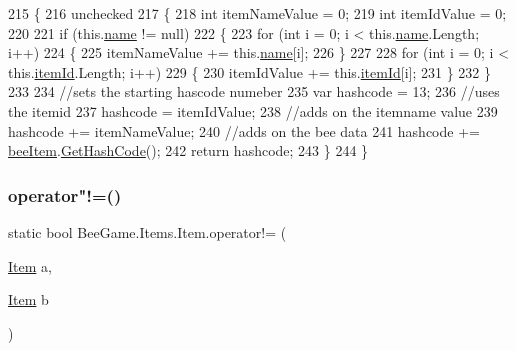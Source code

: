 \begin{DoxyCode}
215         \{
216             unchecked
217             \{
218                 \textcolor{keywordtype}{int} itemNameValue = 0;
219                 \textcolor{keywordtype}{int} itemIdValue = 0;
220 
221                 \textcolor{keywordflow}{if} (this.\hyperlink{struct_bee_game_1_1_items_1_1_item_a0b0bd7eb510757f650f1be3d05b23fc8}{name} != null)
222                 \{
223                     \textcolor{keywordflow}{for} (\textcolor{keywordtype}{int} i = 0; i < this.\hyperlink{struct_bee_game_1_1_items_1_1_item_a0b0bd7eb510757f650f1be3d05b23fc8}{name}.Length; i++)
224                     \{
225                         itemNameValue += this.\hyperlink{struct_bee_game_1_1_items_1_1_item_a0b0bd7eb510757f650f1be3d05b23fc8}{name}[i];
226                     \}
227 
228                     \textcolor{keywordflow}{for} (\textcolor{keywordtype}{int} i = 0; i < this.\hyperlink{struct_bee_game_1_1_items_1_1_item_aa85bfeab893271c26f8ca41b638ada1c}{itemId}.Length; i++)
229                     \{
230                         itemIdValue += this.\hyperlink{struct_bee_game_1_1_items_1_1_item_aa85bfeab893271c26f8ca41b638ada1c}{itemId}[i];
231                     \}
232                 \}
233 
234                 \textcolor{comment}{//sets the starting hascode numeber}
235                 var hashcode = 13;
236                 \textcolor{comment}{//uses the itemid}
237                 hashcode = itemIdValue;
238                 \textcolor{comment}{//adds on the itemname value}
239                 hashcode += itemNameValue;
240                 \textcolor{comment}{//adds on the bee data}
241                 hashcode += \hyperlink{struct_bee_game_1_1_items_1_1_item_a0593f3b7b3ff5daa864f3c6d0ccd77ca}{beeItem}.\hyperlink{struct_bee_game_1_1_bee_1_1_bee_data_ab11b7e2d244cb0021c52ae0b839ff6c3}{GetHashCode}();
242                 \textcolor{keywordflow}{return} hashcode;
243             \}
244         \}
\end{DoxyCode}
\mbox{\label{struct_bee_game_1_1_items_1_1_item_aedf7a9ae2db756f3351e5931dd0e2ee1}} 
\subsubsection{\texorpdfstring{operator"!=()}{operator!=()}}
{\footnotesize\ttfamily static bool Bee\+Game.\+Items.\+Item.\+operator!= (\begin{DoxyParamCaption}\item[{\hyperlink{struct_bee_game_1_1_items_1_1_item}{Item}}]{a,  }\item[{\hyperlink{struct_bee_game_1_1_items_1_1_item}{Item}}]{b }\end{DoxyParamCaption})\hspace{0.3cm}{\ttfamily [static]}}



